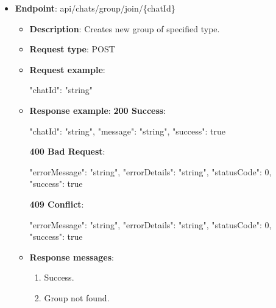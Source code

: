\begin{itemize}
    \item \textbf{Endpoint}: api/chats/group/join/\{chatId\}
    \begin{itemize}
        \item \textbf{Description}: Creates new group of specified type.
        \item \textbf{Request type}: POST
        \item \textbf{Request example}:
        \begin{spverbatim}
        {
            "chatId": "string"
        }
        \end{spverbatim}
        \item \textbf{Response example}:
        \textbf{200 Success}:
        \begin{spverbatim}
        {
            "chatId": "string",
            "message": "string",
            "success": true
        }
        \end{spverbatim}
        \textbf{400 Bad Request}:
        \begin{spverbatim}
        {
            "errorMessage": "string",
            "errorDetails": "string",
            "statusCode": 0,
            "success": true
        }
        \end{spverbatim}
        \textbf{409 Conflict}:
        \begin{spverbatim}
        {
            "errorMessage": "string",
            "errorDetails": "string",
            "statusCode": 0,
            "success": true
        }
        \end{spverbatim}
        \item \textbf{Response messages}:
        \begin{enumerate}
            \item Success.
            \item Group not found.
        \end{enumerate}
    \end{itemize}


\end{itemize}

